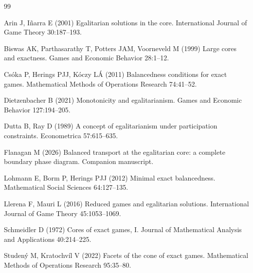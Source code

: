 \documentclass[11pt]{article}
\begin{document}
\begin{thebibliography}{99}

Arin J, I\~narra E (2001) Egalitarian solutions in the core.
International Journal of Game Theory 30:187--193.

Biswas AK, Parthasarathy T, Potters JAM, Voorneveld M (1999) Large cores and
exactness. Games and Economic Behavior 28:1--12.

Cs\'oka P, Herings PJJ, K\'oczy L\'A (2011) Balancedness conditions for exact
games. Mathematical Methods of Operations Research 74:41--52.

Dietzenbacher B (2021) Monotonicity and egalitarianism.
Games and Economic Behavior 127:194--205.

Dutta B, Ray D (1989) A concept of egalitarianism under participation
constraints. Econometrica 57:615--635.

Flanagan M (2026) Balanced transport at the egalitarian core: a complete
boundary phase diagram. Companion manuscript.

Lohmann E, Borm P, Herings PJJ (2012) Minimal exact balancedness.
Mathematical Social Sciences 64:127--135.

Llerena F, Mauri L (2016) Reduced games and egalitarian solutions.
International Journal of Game Theory 45:1053--1069.

Schmeidler D (1972) Cores of exact games, I.
Journal of Mathematical Analysis and Applications 40:214--225.

Studen\'y M, Kratochv\'il V (2022) Facets of the cone of exact games.
Mathematical Methods of Operations Research 95:35--80.

\end{thebibliography}
\end{document}
